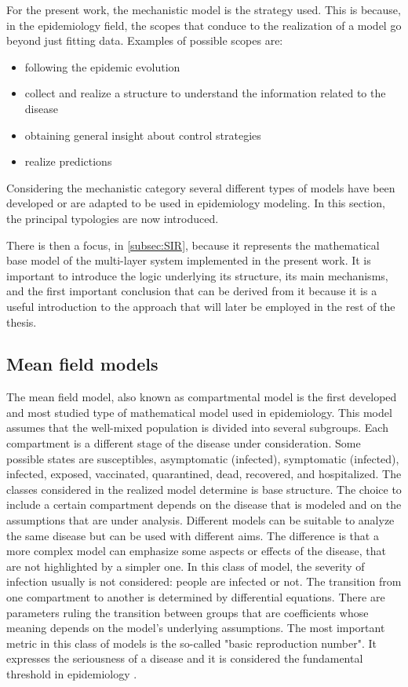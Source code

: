 For the present work, the mechanistic model is the strategy used.  This is because, in the epidemiology field, the scopes that conduce to the realization of a model go beyond just fitting data. Examples of possible scopes are:
\begin{itemize}
	\item following the epidemic evolution
	\item collect and realize a structure to understand the information related to the disease 
	\item obtaining general insight about control strategies
	\item realize predictions
\end{itemize}
Considering the mechanistic category several different types of models have been developed or are adapted to be used in epidemiology modeling. In this section, the principal typologies are now introduced. 

 There is then a focus, in \ref{subsec:SIR}, because it represents the mathematical base model of the multi-layer system implemented in the present work. It is important to introduce the logic underlying its structure, its main mechanisms, and the first important conclusion that can be derived from it because it is a useful introduction to the approach that will later be employed in the rest of the thesis.

\subsection{Mean field models}

The mean field model, also known as compartmental model is the first developed and most studied type of mathematical model used in epidemiology.  This model assumes that the well-mixed population is divided into several subgroups. Each compartment is a different stage of the disease under consideration. Some possible states are susceptibles, asymptomatic (infected), symptomatic (infected), infected, exposed, vaccinated, quarantined, dead, recovered, and hospitalized. The classes considered in the realized model determine is base structure. The choice to include a certain compartment depends on the disease that is modeled and on the assumptions that are under analysis. Different models can be suitable to analyze the same disease but can be used with different aims. The difference is that a more complex model can emphasize some aspects or effects of the disease, that are not highlighted by a simpler one. 
In this class of model, the severity of infection usually is not considered: people are infected or not. The transition from one compartment to another is determined by differential equations. There are parameters ruling the transition between groups that are coefficients whose meaning depends on the model's underlying assumptions. The most important metric in this class of models is the so-called "basic reproduction number". It expresses the seriousness of a disease and it is considered the fundamental threshold in epidemiology \cite{Hernandez_Vargas_2022}. 

